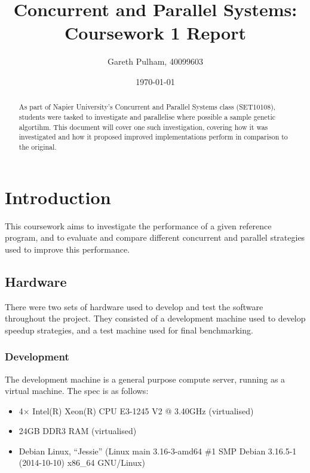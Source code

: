 \documentclass[a4paper]{article}
\begin{document}
    \begin{titlepage}
        \title{Concurrent and Parallel Systems: Coursework 1 Report}
        \author{Gareth Pulham, 40099603}
        \date{\today}
        \maketitle
        \thispagestyle{empty}
        \begin{abstract}
            As part of Napier University's Concurrent and Parallel Systems class (SET10108), students were tasked to
            investigate and parallelise where possible a sample genetic algortihm. This document will cover one such
            investigation, covering how it was investigated and how it proposed improved implementations perform in
            comparison to the original.
        \end{abstract}
    \end{titlepage}

    \tableofcontents

    \section{Introduction}
    This coursework aims to investigate the performance of a given reference program, and to evaluate and compare
    different concurrent and parallel strategies used to improve this performance.

        \subsection{Hardware}
        There were two sets of hardware used to develop and test the software throughout the project. They consisted
        of a development machine used to develop speedup strategies, and a test machine used for final benchmarking.

            \subsubsection{Development}
            The development machine is a general purpose compute server, running as a virtual machine. The spec is as
            follows:
            \begin{itemize}
                \item 4$\times$ Intel(R) Xeon(R) CPU E3-1245 V2 @ 3.40GHz (virtualised)
                \item 24GB DDR3 RAM (virtualised)
                \item Debian Linux, ``Jessie'' (Linux main 3.16-3-amd64 \#1 SMP Debian 3.16.5-1 (2014-10-10) x86\_64 GNU/Linux)
            \end{itemize}
\end{document}
